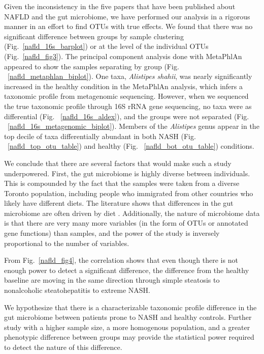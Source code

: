 Given the inconsistency in the five papers that have been published about NAFLD and the gut microbiome, we have performed our analysis in a rigorous manner in an effort to find OTUs with true effects. We found that there was no significant difference between groups by sample clustering (Fig.~\ref{nafld_16s_barplot}) or at the level of the individual OTUs (Fig.~\ref{nafld_fig3}). The principal component analysis done with MetaPhlAn appeared to show the samples separating by group (Fig. ~\ref{nafld_metaphlan_biplot}). One taxa, \textit{Alistipes shahii}, was nearly significantly increased in the healthy condition in the MetaPhlAn analysis, which infers a taxonomic profile from metagenomic sequencing. However, when we sequenced the true taxonomic profile through 16S rRNA gene sequencing, no taxa were as differential (Fig. ~\ref{nafld_16s_aldex}), and the groups were not separated (Fig. ~\ref{nafld_16s_metagenomic_biplot}). Members of the \textit{Alistipes} genus appear in the top decile of taxa differentially abundant in both NASH (Fig. ~\ref{nafld_top_otu_table}) and healthy (Fig. ~\ref{nafld_bot_otu_table}) conditions.

We conclude that there are several factors that would make such a study underpowered. First, the gut microbiome is highly diverse between individuals. This is compounded by the fact that the samples were taken from a diverse Toronto population, including people who immigrated from other countries who likely have different diets. The literature shows that differences in the gut microbiome are often driven by diet \cite{david2014diet}. Additionally, the nature of microbiome data is that there are very many more variables (in the form of OTUs or annotated gene functions) than samples, and the power of the study is inversely proportional to the number of variables.

From Fig.~\ref{nafld_fig4}, the correlation shows that even though there is not enough power to detect a significant difference, the difference from the healthy baseline are moving in the same direction through simple steatosis to nonalcoholic steatohepatitis to extreme NASH.

We hypothesize that there is a characterizable taxonomic profile difference in the gut microbiome between patients prone to NASH and healthy controls. Further study with a higher sample size, a more homogenous population, and a greater phenotypic difference between groups may provide the statistical power required to detect the nature of this difference.

